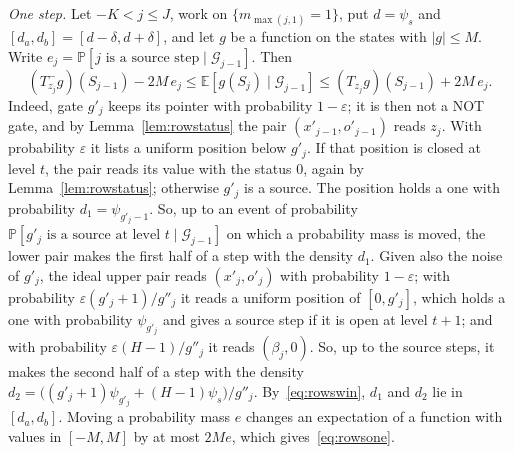 \documentclass[11pt]{amsart}
\theoremstyle{definition}
\theoremstyle{remark}
\newcommand{\eps}{\varepsilon}
\newcommand{\PP}{\mathbb{P}}
\newcommand{\EE}{\mathbb{E}}
\begin{document}
\emph{One step.} Let $-K<j\le J$, work on $\{m_{\max(j,1)}=1\}$, put $d=\psi_s$ and
$[d_a,d_b]=[d-\delta,d+\delta]$, and let $g$ be a function on the states with $|g|\le M$. Write
$e_j=\PP[j\text{ is a source step}\mid\mathcal G_{j-1}]$. Then
\begin{equation}\label{eq:rowsone}
(T^-_{z_j}g)(S_{j-1})-2M\,e_j\le\EE[g(S_j)\mid\mathcal G_{j-1}]\le(T_{z_j}g)(S_{j-1})+2M\,e_j .
\end{equation}
Indeed, gate $g'_j$ keeps its pointer with probability $1-\eps$; it is then not a NOT gate, and by
Lemma~\ref{lem:rowstatus} the pair $(x'_{j-1},o'_{j-1})$ reads $z_j$. With probability $\eps$ it
lists a uniform position below $g'_j$. If that position is closed at level $t$, the pair reads
its value with the status $0$, again by Lemma~\ref{lem:rowstatus}; otherwise $g'_j$ is a source. The
position holds a one with probability $d_1=\psi_{g'_j-1}$. So, up to an event of probability
$\PP[g'_j\text{ is a source at level }t\mid\mathcal G_{j-1}]$ on which a probability mass is moved,
the lower pair makes the first half of a step with the density $d_1$. Given also the noise of
$g'_j$, the ideal upper pair reads $(x'_j,o'_j)$ with probability $1-\eps$; with probability
$\eps(g'_j+1)/g''_j$ it reads a uniform position of $[0,g'_j]$, which holds a one with probability
$\psi_{g'_j}$ and gives a source step if it is open at level $t+1$; and with probability
$\eps(H-1)/g''_j$ it reads $(\beta_j,0)$. So, up to the source steps, it makes the second half of
a step with the density $d_2=\bigl((g'_j+1)\psi_{g'_j}+(H-1)\psi_s\bigr)/g''_j$.
By~\eqref{eq:rowswin}, $d_1$ and $d_2$ lie in $[d_a,d_b]$. Moving a probability mass $e$ changes
an expectation of a function with values in $[-M,M]$ by at most $2Me$, which
gives~\eqref{eq:rowsone}.
\end{document}

